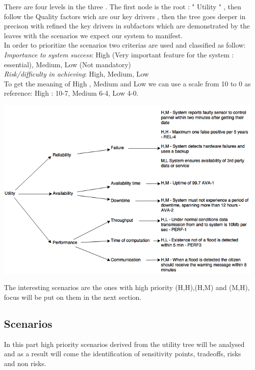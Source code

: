 There are four levels in the three . The first node is the root : " Utility " , then follow the Quality factors wich are our key drivers , then the tree goes deeper in precison with refined the key drivers in subfactors which are demonstrated by the leaves with the scenarios we expect our system to manifest. \\

In order to prioritize the scenarios two criterias are used and classified as follow: \\
\textit{Importance  to system success}: High (Very important feature for the system : essential), Medium, Low (Not mandatory)\\
\textit{ Risk/difficulty in achieving}: High, Medium, Low\\
To get the meaning of High , Medium and Low we can use a scale from 10 to 0 as reference: High : 10-7, Medium 6-4, Low 4-0.

\includegraphics[scale=0.5]{images/utilitytree1.png}

The interesting scenarios are the ones with high priority (H,H),(H,M) and (M,H), focus will be put on them in the next section.

\subsection{Scenarios}

In this part high priority scenarios derived from the utility tree will be analysed and as a result will come the identification of sensitivity points, tradeoffs, risks and non risks.


